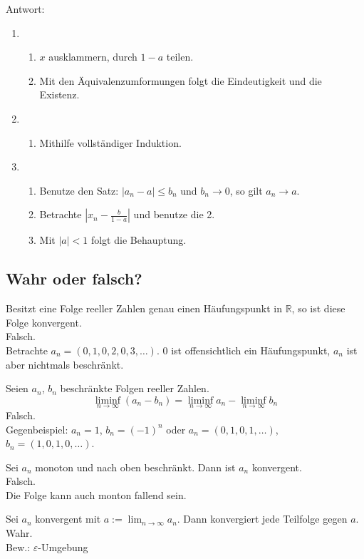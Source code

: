 Antwort:
\begin{enumerate}
    \item
    \begin{enumerate}
        \item $x$ ausklammern, durch $1-a$ teilen.
        \item Mit den Äquivalenzumformungen folgt die Eindeutigkeit und die Existenz.
    \end{enumerate}
    \item
    \begin{enumerate}
        \item Mithilfe vollständiger Induktion.
    \end{enumerate}
    \item
    \begin{enumerate}
        \item Benutze den Satz: $|a_n - a| \leq b_n$ und $b_n \to 0$, so gilt $a_n \to a$.
        \item Betrachte $|x_n - \frac{b}{1-a}|$ und benutze die 2.
        \item Mit $|a| < 1$ folgt die Behauptung.
    \end{enumerate}
\end{enumerate}

\subsection{Wahr oder falsch?}
Besitzt eine Folge reeller Zahlen genau einen Häufungspunkt in $\mathbb{R}$, so ist diese Folge konvergent.\\
Falsch.\\
Betrachte $a_n = (0,1,0,2,0,3,\dots)$. $0$ ist offensichtlich ein Häufungspunkt, $a_n$ ist aber nichtmals beschränkt.

Seien $a_n$, $b_n$ beschränkte Folgen reeller Zahlen.
\begin{displaymath}
  \liminf_{n \to \infty} (a_n - b_n) = \liminf_{n \to \infty} a_n - \liminf_{n \to \infty} b_n
\end{displaymath}
Falsch.\\
Gegenbeispiel: $a_n = 1$, $b_n = (-1)^n$ oder $a_n = (0,1,0,1,\dots)$, $b_n = (1,0,1,0,\dots)$.

Sei $a_n$ monoton und nach oben beschränkt.
Dann ist $a_n$ konvergent.\\
Falsch.\\
Die Folge kann auch monton fallend sein.

Sei $a_n$ konvergent mit $a := \lim_{n \to \infty} a_n$.
Dann konvergiert jede Teilfolge gegen $a$.\\
Wahr.\\
Bew.: $\varepsilon$-Umgebung

